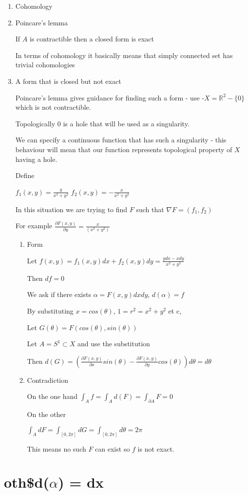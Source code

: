 \documentclass[11pt]{article}
\begin{document}
\begin{enumerate}
\item Cohomology
\label{sec:orgc6ced4e}

\item Poincare's lemma
\label{sec:orgaae1bb6}

If \(A\) is contractible then a closed form is exact

In terms of cohomology it basically means that simply connected set has trivial cohomologies


\item A form that is closed but not exact
\label{sec:orgd4179a1}

Poincare's lemma gives guidance for finding such a form - use    -\(X = \mathbb{R}^2 - \{0\}\) which is not contractible.

Topologically \(0\) is a hole that will be used as a singularity.

We can specify a continuous function that has such a singularity - this behaviour will mean that our function represents topological property of \(X\) having a hole.

Define

\(f_1(x, y) = \frac{y}{x^2 + y^2}\)
\(f_2(x, y) = - \frac{x}{x^2 + y^2}\)

In this situation we are trying to find \(F\) such that \(\nabla F = (f_1, f_2)\)

For example \(\frac{\partial F(x,y)}{\partial y} = \frac{x}{(x^2+y^2)}\)

\begin{enumerate}
\item Form
\label{sec:org105b747}

Let \(f(x, y) = f_1(x,y) dx + f_2(x,y) dy =  \frac{y dx - x dy}{x^2 + y^2}\)

Then \(df = 0\)

We ask if there exists \(\alpha = F(x, y) dxdy\), \(d(\alpha) = f\)

By substituting \(x = cos(\theta)\), \(1 = r^2 = x^2 + y^2\) et c,

Let \(G(\theta) = F(cos(\theta), sin(\theta))\)

Let \(A = S^1 \subset X\) and use the substitution

Then \(d(G) = (\frac{\partial F(x,y)}{\partial x} sin(\theta) -  \frac{\partial F(x,y)}{\partial y} cos(\theta)) d\theta = d\theta\)

\item Contradiction
\label{sec:org98d33e4}

On the one hand
\(\int_A f = \int_A d(F) = \int_{\partial A} F = 0\)

On the other

\(\int_{A} dF = \int_{[0,2 \pi]} dG = \int_{[0, 2 \pi]} d\theta = 2 \pi\)

This means no such \(F\) can exist so \(f\) is not exact.
\end{enumerate}
\end{enumerate}

\section{oth\$d(\(\alpha\)) =  dx}
\label{sec:orge538b03}
\end{document}
